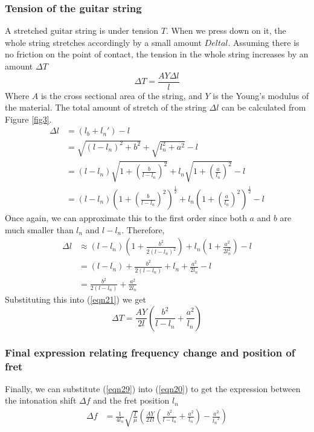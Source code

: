 \documentclass[11pt]{article}
\begin{document}
\begin{flushleft}
            \subsubsection*{Tension of the guitar string}
                A stretched guitar string is under tension $T$. When we press down on it, the whole string stretches accordingly by a small amount $Delta l$. Assuming there is no friction on the point of contact, the tension in the whole string increases by an amount $\Delta T$
                \begin{equation}
                    \Delta T = \frac{AY\Delta l}{l}\label{eqn21}
                \end{equation} 
                Where $A$ is the cross sectional area of the string, and $Y$ is the Young's modulus of the material.
                The total amount of stretch of the string $\Delta l$ can be calculated from Figure \ref{fig3}. 
                \begin{align}
                    \Delta l &= (l_b + l_n') - l \\
                    &= \sqrt{(l-l_n)^2+b^2} + \sqrt{l_n^2+a^2} - l \\
                    &= (l-l_n)\sqrt{1+\left(\frac{b}{l-l_n}\right)^2} + l_n\sqrt{1+\left(\frac{a}{l_n}\right)^2} - l\\
                    &= (l-l_n)\left(1+\left(\frac{b}{l-l_n}\right)^2\right)^{\frac{1}{2}} + l_n\left(1+\left(\frac{a}{l_n}\right)^2\right)^{\frac{1}{2}} - l
                \end{align}
                Once again, we can approximate this to the first order since both $a$ and $b$ are much smaller than $l_n$ and $l-l_n$. Therefore,
                \begin{align}
                    \Delta l &\approx (l-l_n)\left(1+\frac{b^2}{2(l-l_n)^2}\right)+ l_n\left(1+\frac{a^2}{2l_n^2}\right) - l \\
                    &= (l - l_n) + \frac{b^2}{2(l-l_n)} + l_n + \frac{a^2}{2l_n} - l \\
                    &= \frac{b^2}{2(l-l_n)} + \frac{a^2}{2l_n}
                \end{align}
                Substituting this into (\ref{eqn21}) we get
                \begin{equation}
                    \Delta T = \frac{AY}{2l} \left( \frac{b^2}{l-l_n} + \frac{a^2}{l_n} \right) \label{eqn29}
                \end{equation}
            \subsubsection*{Final expression relating frequency change and position of fret}
                Finally, we can substitute (\ref{eqn29}) into (\ref{eqn20}) to get the expression between the intonation shift $\Delta f$ and the fret position $l_n$
                \begin{align}
                    \Delta f &= \frac{1}{4l_n} \sqrt{\frac{T}{\mu}} \left( \frac{AY}{2Tl} \left( \frac{b^2}{l-l_n} + \frac{a^2}{l_n} \right) - \frac{a^2}{{l_n}^2} \right) \label{eqn30}
                \end{align}
                


\end{flushleft}
\end{document}
